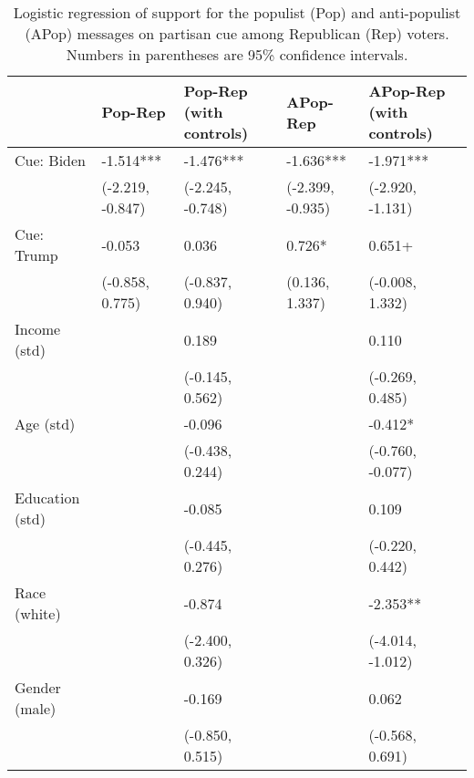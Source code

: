 \begin{table}[th!]
\centering
\caption{Logistic regression of support for the populist (Pop) and anti-populist (APop) messages on partisan cue among Republican (Rep) voters. Numbers in parentheses are 95\% confidence intervals.}
\label{tab-reg-rep.tex}
\begin{threeparttable}
\begin{tabular}{lC{2.7cm}C{2.7cm}C{2.7cm}C{2.7cm}}
\toprule
                &          Pop-Rep & Pop-Rep (with controls) &         APop-Rep & APop-Rep (with controls) \\
\midrule
     Cue: Biden &        -1.514*** &               -1.476*** &        -1.636*** &                -1.971*** \\
                & (-2.219, -0.847) &        (-2.245, -0.748) & (-2.399, -0.935) &         (-2.920, -1.131) \\
     Cue: Trump &           -0.053 &                   0.036 &           0.726* &                   0.651+ \\
                &  (-0.858, 0.775) &         (-0.837, 0.940) &   (0.136, 1.337) &          (-0.008, 1.332) \\
   Income (std) &                  &                   0.189 &                  &                    0.110 \\
                &                  &         (-0.145, 0.562) &                  &          (-0.269, 0.485) \\
      Age (std) &                  &                  -0.096 &                  &                  -0.412* \\
                &                  &         (-0.438, 0.244) &                  &         (-0.760, -0.077) \\
Education (std) &                  &                  -0.085 &                  &                    0.109 \\
                &                  &         (-0.445, 0.276) &                  &          (-0.220, 0.442) \\
   Race (white) &                  &                  -0.874 &                  &                 -2.353** \\
                &                  &         (-2.400, 0.326) &                  &         (-4.014, -1.012) \\
  Gender (male) &                  &                  -0.169 &                  &                    0.062 \\
                &                  &         (-0.850, 0.515) &                  &          (-0.568, 0.691) \\

\end{tabular}
\end{threeparttable}
\end{table}
